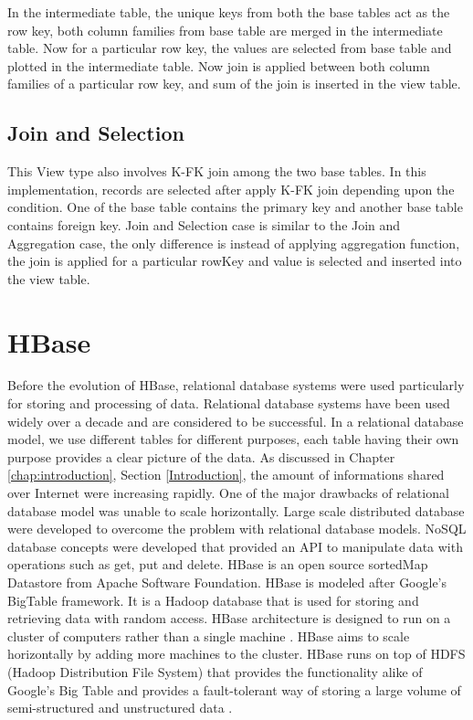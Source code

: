 \documentclass[11pt,a4paper,bibtotoc,idxtotoc,headsepline,footsepline,footexclude,BCOR12mm,DIV13]{scrbook}
\begin{document}
In the intermediate table, the unique keys from both the base tables act as the row key, both column families from base table are merged in the intermediate table. Now for a particular row key, the values are selected from base table and plotted in the intermediate table. Now join is applied between both column families of a particular row key, and sum of the join is inserted in the view table.  


\subsection{Join and Selection}
This View type also involves K-FK join among the two base tables. In this implementation, records are selected after apply K-FK join depending upon the condition. One of the base table contains the primary key and another base table contains foreign key. Join and Selection case is similar to the Join and Aggregation case, the only difference is instead of applying aggregation function, the join is applied for a particular rowKey and value is selected and inserted into the view table. 

\newpage
\section{HBase}
\label{sec:hbase}

Before the evolution of HBase, relational database systems were used particularly for storing and processing of data. Relational database systems have been used widely over a decade and are considered to be successful. In a relational database model, we use different tables for different purposes, each table having their own purpose provides  
a clear picture of the data. As discussed in Chapter \ref{chap:introduction}, Section \ref{Introduction}, the amount of informations shared over Internet were increasing rapidly. One of the major drawbacks of relational database model was unable to scale horizontally. Large scale distributed database were developed to overcome the problem with relational database models. NoSQL database concepts were developed that provided an API to manipulate data with operations such as get, put and delete. HBase is an open source sortedMap Datastore from Apache Software Foundation. HBase is modeled after Google's BigTable framework. It is a Hadoop database that is used for storing and retrieving data with random access. HBase architecture is designed to run on a cluster of computers rather than a single machine \cite{coprocessor:detail}. HBase aims to scale horizontally by adding more machines to the cluster. HBase runs on top of HDFS (Hadoop Distribution File System) that provides the functionality alike of Google's Big Table and provides a fault-tolerant way of storing a large volume of semi-structured and unstructured data \cite{bigdata:analysis}.
\end{document}
